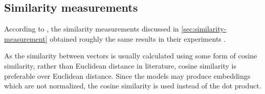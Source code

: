 \subsection*{Similarity measurements}\label{subsec:evaluation-sim-measurements}

According to \citeauthor{HfsentTrans2019}, the similarity measurements discussed in \autoref{sec:similarity-measurement} 
obtained roughly the same results in their experiments \cite{HfsentTrans2019}.   

As the similarity between vectors is usually calculated using some form of cosine similarity, 
rather than Euclidean distance in literature, cosine similarity is preferable over Euclidean distance. 
Since the models may produce embeddings which are not normalized, the cosine similarity is used instead of the dot product.